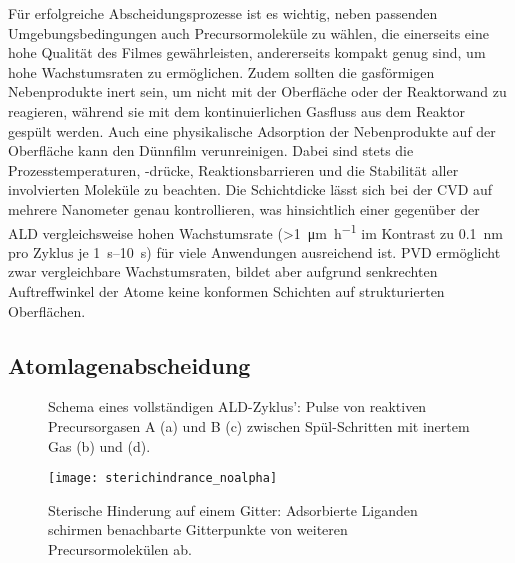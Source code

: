 Für erfolgreiche Abscheidungsprozesse ist es wichtig, neben passenden Umgebungsbedingungen auch Precursormoleküle zu wählen, die einerseits eine hohe Qualität des Filmes gewährleisten, andererseits kompakt genug sind, um hohe Wachstumsraten zu ermöglichen.
Zudem sollten die gasförmigen Nebenprodukte inert sein, um nicht mit der Oberfläche oder der Reaktorwand zu reagieren, während sie mit dem kontinuierlichen Gasfluss aus dem Reaktor gespült werden.
Auch eine physikalische Adsorption der Nebenprodukte auf der Oberfläche kann den Dünnfilm verunreinigen.
Dabei sind stets die Prozesstemperaturen, -drücke, Reaktionsbarrieren und die Stabilität aller involvierten Moleküle zu beachten.
Die Schichtdicke lässt sich bei der CVD auf mehrere Nanometer genau kontrollieren, was hinsichtlich einer gegenüber der ALD vergleichsweise hohen Wachstumsrate (\SI{>1}{\micro\meter\per\hour} im Kontrast zu \SI{0.1}{\nano\meter} pro Zyklus je \SIrange{1}{10}{\second}\cite{pierson_handbook_1999,puurunen_surface_2005}) für viele Anwendungen ausreichend ist.
PVD ermöglicht zwar vergleichbare Wachstumsraten, bildet aber aufgrund senkrechten Auftreffwinkel der Atome keine konformen Schichten auf strukturierten Oberflächen.

\subsection{Atomlagenabscheidung}

\begin{figure}[t]
  \centering
  \def\svgwidth{\textwidth}
  
  \caption[Schema eines vollständigen ALD-Zyklus']{
    Schema eines vollständigen ALD-Zyklus':
    Pulse von reaktiven Precursorgasen A (a) und B (c) zwischen Spül-Schritten mit inertem Gas (b) und (d).
  }
  \label{fig:ald-schema}
\end{figure}

\begin{figure}[b]
  \centering
  \texttt{[image: sterichindrance\_noalpha]}
  \caption[Sterische Hinderung auf einem Gitter]{
    Sterische Hinderung auf einem Gitter:
    Adsorbierte Liganden schirmen benachbarte Gitterpunkte von weiteren Precursormolekülen ab.
  }
  \label{fig:sterichindrance}
\end{figure}

